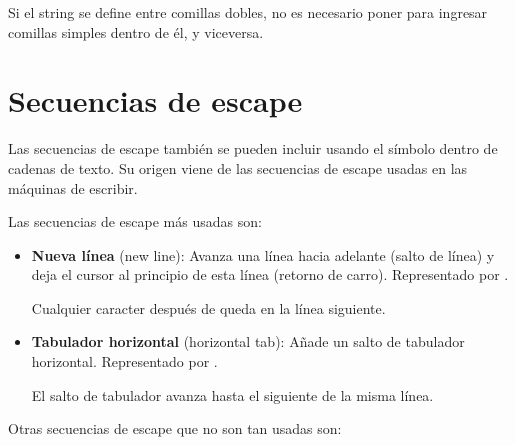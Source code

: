 Si el string se define entre comillas dobles, no es necesario poner \ttt{\q} para ingresar comillas simples dentro de él, y viceversa.


\section{Secuencias de escape}

Las secuencias de escape también se pueden incluir usando el símbolo \ttt{\textbackslash} dentro de cadenas de texto.
Su origen viene de las secuencias de escape usadas en las máquinas de escribir.
\medskip

Las secuencias de escape más usadas son:

\begin{itemize}
  \item \textbf{Nueva línea} (new line): Avanza una línea hacia adelante (salto de línea) y deja el cursor al principio de esta línea (retorno de carro).
Representado por .
  
  
  Cualquier caracter después de  queda en la línea siguiente.

  \item \textbf{Tabulador horizontal} (horizontal tab): Añade un salto de tabulador horizontal.
Representado por .
  
  
  El salto de tabulador avanza hasta el siguiente  de la misma línea.

\end{itemize}

Otras secuencias de escape que no son tan usadas son:

